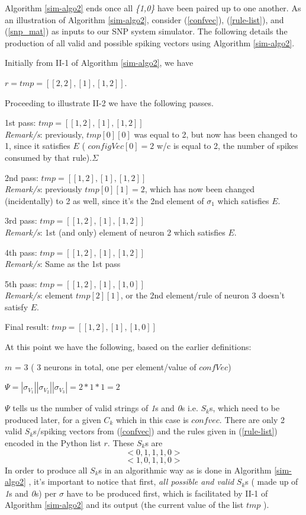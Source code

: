 \documentclass{svmultm}
\begin{document}
Algorithm \ref{sim-algo2} ends once all \textit{\{1,0\}} have been paired up to one another. As an illustration of Algorithm \ref{sim-algo2}, consider (\ref{confvec}), (\ref{rule-list}), and (\ref{snp_mat}) as inputs to our SNP system simulator. The following details the production of all valid and possible spiking vectors using Algorithm \ref{sim-algo2}.

Initially from II-1 of Algorithm \ref{sim-algo2}, we have

$r = tmp = [ [ 2, 2 ], [ 1 ], [ 1, 2 ] ]$.

Proceeding to illustrate II-2 we have the following passes.

1st pass:
$tmp = [ [ 1, 2 ], [ 1 ], [ 1, 2 ] ]$\\
\textit{Remark/s}: previously, $tmp [ 0 ][ 0 ]$ was equal to 2,
but now has been changed to 1, since it satisfies $E$
( $configVec[ 0 ] = 2$ w/c is equal to 2, the
number of spikes consumed by that rule).$\Sigma$

2nd pass:
$tmp = [ [ 1, 2 ], [ 1 ], [ 1, 2 ] ]$\\
\textit{Remark/s}: previously $tmp[ 0 ][ 1 ] = 2$, which has
now been changed (incidentally) to 2 as well, since
it's the 2nd element of $\sigma_1$ which satisfies $E$.

3rd pass:
$tmp = [ [ 1, 2 ], [ 1 ], [ 1, 2 ] ]$\\
\textit{Remark/s}: 1st (and only) element of neuron 2 which
satisfies $E$.

4th pass:
$tmp = [ [ 1, 2 ], [ 1 ], [ 1, 2 ] ]$\\
\textit{Remark/s}: Same as the 1st pass

5th pass:
$tmp = [ [ 1, 2 ], [ 1 ], [ 1, 0 ] ]$\\
\textit{Remark/s}: element $tmp[ 2 ][ 1 ]$, or the 2nd
element/rule of neuron 3 doesn't satisfy $E$.

Final result:
$tmp = [ [ 1, 2 ], [ 1 ], [ 1, 0 ] ]$

At this point we have the following, based on the
earlier definitions:

$m$ = 3 ( 3 neurons in total, one per element/value of
$confVec$)

$\Psi = |\sigma_{V_1}| |\sigma_{V_2}| |\sigma_{V_3}| = 2 * 1 * 1 = 2$

$\Psi$ tells us the number of valid strings of \textit{1}s and \textit{0}s i.e.
$S_k$s, which need to be produced later, for a
given $C_k$ which in this case is $confvec$. There are only
2 valid $S_k$s/spiking vectors from (\ref{confvec}) and the
rules given in (\ref{rule-list}) encoded in the Python list $r$. These $S_k$s are
\begin{equation}\label{sk-211-1}
< 0, 1, 1, 1, 0>
\end{equation}
\begin{equation}\label{sk-211-2}
< 1, 0, 1, 1, 0>
\end{equation}
In order to produce all $S_k$s in an algorithmic way as is done in Algorithm \ref{sim-algo2} , it's
important to notice that first, \textit{all possible and valid} $S_k$s ( made up of \textit{1}s and \textit{0}s) per $\sigma$ have to be
produced first, which is facilitated by II-1 of Algorithm \ref{sim-algo2} and its output (the
current value of the list $tmp$ ).
\end{document}
